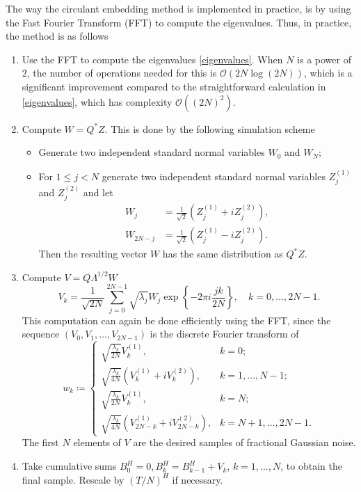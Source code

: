 The way the circulant embedding method is implemented in practice, is by using the Fast Fourier Transform (FFT) to compute the eigenvalues. Thus, in practice, the method is as follows
\begin{enumerate}
    \item Use the FFT to compute the eigenvalues \eqref{eigenvalues}. When $N$ is a power of $2$, the number of operations needed for this is $\mathcal{O}(2N\log(2N))$, which is a significant improvement compared to the straightforward calculation in \eqref{eigenvalues}, which has complexity $\mathcal{O}((2N)^2)$.
    \item Compute $W=Q^{*}Z$. This is done by the following simulation scheme
    \begin{itemize}
        \item Generate two independent standard normal variables $W_0$ and $W_N$;
        \item For $1\leq j<N$ generate two independent standard normal variables $Z^{(1)}_{j}$ and $Z^{(2)}_{j}$ and let
        \begin{align*}
            W_{j}&=\frac{1}{\sqrt{2}}\left(Z^{(1)}_{j}+iZ^{(2)}_{j}\right),\\
            W_{2N-j}&=\frac{1}{\sqrt{2}}\left(Z^{(1)}_{j}-iZ^{(2)}_{j}\right).
        \end{align*}
        Then the resulting vector $W$ has the same distribution as $Q^{*}Z$.
    \end{itemize}
    \item Compute $V=Q\Lambda^{1/2}W$
    \begin{equation}
        V_{k}=\frac{1}{\sqrt{2N}}\sum_{j=0}^{2N-1}\sqrt{\lambda_{j}}W_{j}\exp\left\{-2\pi i\frac{jk}{2N}\right\},\quad k=0,\dots,2N-1.
    \end{equation}
    This computation can again be done efficiently using the FFT, since the sequence $(V_{0},V_{1},\dots,V_{2N-1})$ is the discrete Fourier transform of 
    \begin{equation}
        w_{k}\coloneqq\begin{cases}
\sqrt{\frac{\lambda_{k}}{2N}}V_{k}^{(1)}, & k=0;\\
\sqrt{\frac{\lambda_{k}}{4N}}\left(V_{k}^{(1)}+iV_{k}^{(2)}\right), & k=1,\dots,N-1;\\
\sqrt{\frac{\lambda_{k}}{2N}}V_{k}^{(1)}, & k=N;\\
\sqrt{\frac{\lambda_{k}}{4N}}\left(V_{2N-k}^{(1)}+iV_{2N-k}^{(2)}\right), & k=N+1,\dots,2N-1.
        \end{cases}
    \end{equation}
The first $N$ elements of $V$ are the desired samples of fractional Gaussian noise.
\item Take cumulative sums $B_{0}^{H}=0, B_{k}^{H}=B_{k-1}^{H}+V_{k}$, $k=1,\dots,N$, to obtain the final sample. Rescale by $(T/N)^{H}$ if necessary. 
\end{enumerate}
